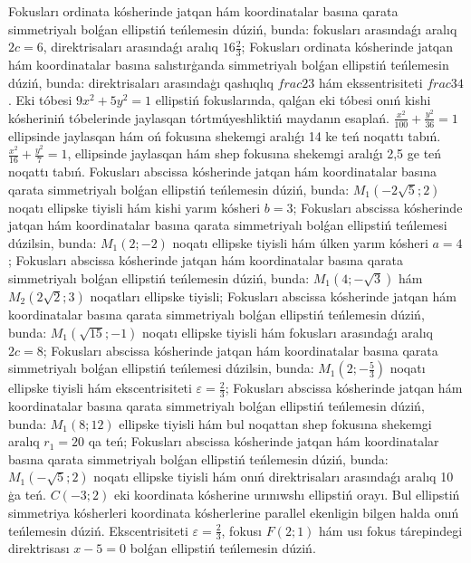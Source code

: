 Fokusları ordinata kósherinde jatqan hám koordinatalar basına qarata simmetriyalı bolǵan ellipstiń teńlemesin dúziń, bunda: fokusları arasındaǵı aralıq $2 c=6$, direktrisaları arasındaǵı aralıq $16 \frac{2}{3}$;
Fokusları ordinata kósherinde jatqan hám koordinatalar basına salıstırģanda simmetriyalı bolǵan ellipstiń teńlemesin dúziń, bunda: direktrisaları arasındaģı qashıqlıq $frac{2}{3}$ hám ekssentrisiteti $frac{3}{4}$.
Eki tóbesi $9 x^2+5 y^2=1$ ellipstiń fokuslarında, qalǵan eki tóbesi onıń kishi kósheriniń tóbelerinde jaylasqan tórtmúyeshliktiń maydanın esaplań.
$\frac{x^2}{100}+\frac{y^2}{36}=1$ ellipsinde jaylasqan hám oń fokusına shekemgi aralıǵı 14 ke teń noqattı tabıń.
$\frac{x^2}{16}+\frac{y^2}{7}=1$, ellipsinde jaylasqan hám shep fokusına shekemgi aralıǵı 2,5 ge teń noqattı tabıń.
Fokusları abscissa kósherinde jatqan hám koordinatalar basına qarata simmetriyalı bolǵan ellipstiń teńlemesin dúziń, bunda: $M_1 (-2 \sqrt{5}; 2) $ noqatı ellipske tiyisli hám kishi yarım kósheri $b=3$;
Fokusları abscissa kósherinde jatqan hám koordinatalar basına qarata simmetriyalı bolǵan ellipstiń teńlemesi dúzilsin, bunda: $M_1 (2;-2) $ noqatı ellipske tiyisli hám úlken yarım kósheri $a=4$;
Fokusları abscissa kósherinde jatqan hám koordinatalar basına qarata simmetriyalı bolǵan ellipstiń teńlemesin dúziń, bunda: $M_1 (4;-\sqrt{3}) $ hám $M_2 (2 \sqrt{2}; 3)$ noqatları ellipske tiyisli;
Fokusları abscissa kósherinde jatqan hám koordinatalar basına qarata simmetriyalı bolǵan ellipstiń teńlemesin dúziń, bunda: $M_1 (\sqrt{15};-1) $ noqatı ellipske tiyisli hám fokusları arasındaǵı aralıq $2 c=8$;
Fokusları abscissa kósherinde jatqan hám koordinatalar basına qarata simmetriyalı bolǵan ellipstiń teńlemesi dúzilsin, bunda: $M_1 \left(2;-\frac{5}{3}\right) $ noqatı ellipske tiyisli hám ekscentrisiteti $\varepsilon=\frac{2}{3}$;
Fokusları abscissa kósherinde jatqan hám koordinatalar basına qarata simmetriyalı bolǵan ellipstiń teńlemesin dúziń, bunda: $M_1 (8; 12) $ ellipske tiyisli hám bul noqattan shep fokusına shekemgi aralıq $r_1=20$ qa teń;
Fokusları abscissa kósherinde jatqan hám koordinatalar basına qarata simmetriyalı bolǵan ellipstiń teńlemesin dúziń, bunda: $M_1 (-\sqrt{5}; 2)$ noqatı ellipske tiyisli hám onıń direktrisaları arasındaǵı aralıq 10 ģa teń.
$C (-3; 2)$ eki koordinata kósherine urınıwshı ellipstiń orayı. Bul ellipstiń simmetriya kósherleri koordinata kósherlerine parallel ekenligin bilgen halda onıń teńlemesin dúziń.
Ekscentrisiteti $\varepsilon=\frac{2}{3}$, fokusı $F (2; 1) $ hám usı fokus tárepindegi direktrisası $x-5=0$ bolǵan ellipstiń teńlemesin dúziń.
